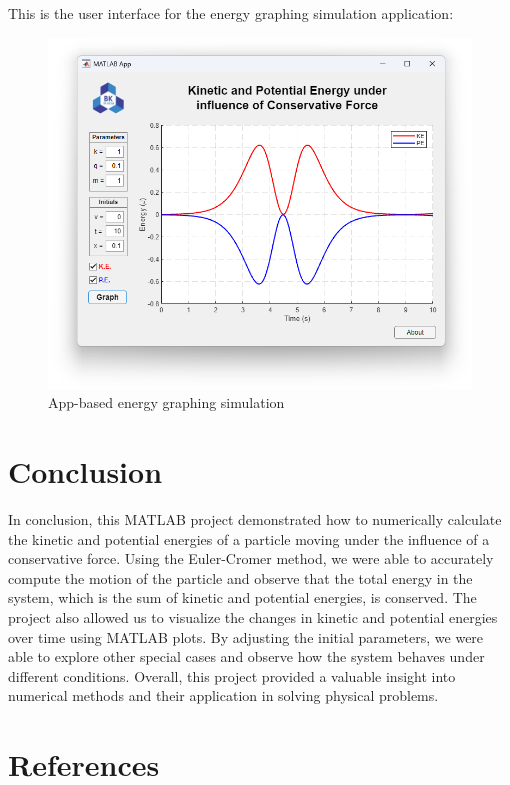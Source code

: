 \documentclass[13pt,a4paper]{report}
\begin{document}
\vspace{0.2cm}

This is the user interface for the energy graphing simulation application:

\vspace{-0.25cm}
\begin{figure}[!ht]
  \centering
  \includegraphics[scale=0.6]{result.png}
  \vspace{-0.75cm}
  \caption{App-based energy graphing simulation}
  \label{fig:result}
\end{figure}

\section{Conclusion}
In conclusion, this MATLAB project demonstrated how to numerically calculate the kinetic and potential energies of a particle moving under the influence of a conservative force. Using the Euler-Cromer method, we were able to accurately compute the motion of the particle and observe that the total energy in the system, which is the sum of kinetic and potential energies, is conserved. The project also allowed us to visualize the changes in kinetic and potential energies over time using MATLAB plots. By adjusting the initial parameters, we were able to explore other special cases and observe how the system behaves under different conditions. Overall, this project provided a valuable insight into numerical methods and their application in solving physical problems.

\newpage
\section{References}
\vspace{0.25cm}
\begin{itemize}[leftmargin=-0.655cm, label=]
    \begin{otherlanguage}{vietnamese}
        \nocite{*}%
        \printbibliography[heading=none]
    \end{otherlanguage}
\end{itemize}
\end{document}
